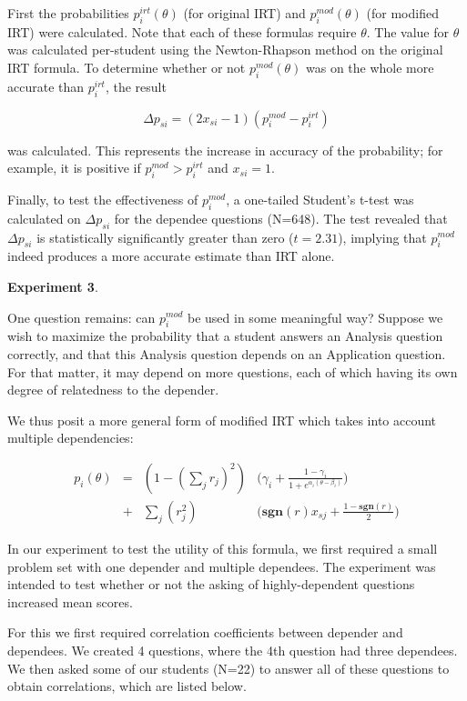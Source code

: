 \documentclass[a4paper,twocolumn]{article}
\begin{document}
First the probabilities $p_i^{irt}(\theta)$ (for original IRT) and
$p_i^{mod}(\theta)$ (for modified IRT) were calculated.  Note that each of
these formulas require $\theta$. The value for $\theta$ was calculated
per-student using the Newton-Rhapson method on the original IRT formula.  To
determine whether or not $p_i^{mod}(\theta)$ was on the whole more accurate
than $p_i^{irt}$, the result

\[
  \Delta p_{si} = (2x_{si}-1) (p_i^{mod} - p_i^{irt})
\]

was calculated. This represents the increase in accuracy of the probability;
for example, it is positive if $p_i^{mod} > p_i^{irt}$ and $x_{si} = 1$.

Finally, to test the effectiveness of $p_i^{mod}$, a one-tailed Student's
t-test was calculated on $\Delta p_{si}$ for the dependee questions (N=648).
The test revealed that $\Delta p_{si}$ is statistically significantly greater
than zero ($t=2.31$), implying that $p_i^{mod}$ indeed produces a more accurate
estimate than IRT alone. 


\textbf{Experiment 3}. 

One question remains: can $p_i^{mod}$ be used in some meaningful way?  Suppose
we wish to maximize the probability that a student answers an Analysis question
correctly, and that this Analysis question depends on an Application question.  
For that matter, it may depend on more questions, each of which having its own
degree of relatedness to the depender.

We thus posit a more general form of modified IRT which takes into account
multiple dependencies:

\begin{align*}
  p_i(\theta) &=& (1- (\displaystyle\sum_j r_j)^2) & \Big(\gamma_i + \frac{1-\gamma_i}{1+e^{\alpha_i(\theta-\beta_i)}}\Big) \\
              &+& \displaystyle\sum_j (r_j^2)   & \Big(\mathbf{sgn}(r)x_{sj}+\frac{1-\mathbf{sgn}(r)}{2}\Big)
\end{align*}

In our experiment to test the utility of this formula, we first required a
small problem set with one depender and multiple dependees.  The experiment
was intended to test whether or not the asking of highly-dependent questions
increased mean scores.

For this we first required correlation coefficients between depender and
dependees.  We created 4 questions, where the 4th question had three
dependees.  We then asked some of our students (N=22) to answer all of these
questions to obtain correlations, which are listed below.  
\end{document}
